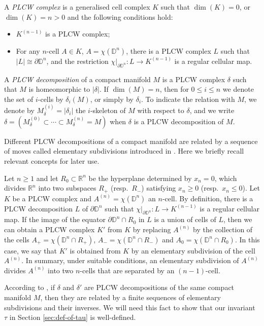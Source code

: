 \documentclass[11pt]{amsart}
\theoremstyle{definition}
\numberwithin{equation}{section}
\def\bd{{\partial}}
\def\bD{{\mathbb{D}}}
\def\bR{{\mathbb{R}}}
\def\de{\delta}
\def\to{\rightarrow}
\begin{document}
A \textit{PLCW complex} is a generalised cell complex $K$ such that $\dim(K)=0$, or $\dim(K)=n>0$ and the following conditions hold:
\begin{itemize}
\item $K^{(n-1)}$ is a PLCW complex;
\item For any $n$-cell $A \in K$, $A = \chi(\bD^n)$, there is a PLCW complex $L$ such that $|L| \cong \bd\bD^n$, and the restriction $\chi|_{\bd\bD^n}: L \to K^{(n-1)}$ is a regular cellular map.
\end{itemize}

A \emph{PLCW decomposition} of a compact manifold $M$ is a PLCW complex $\de$ such that $M$ is homeomorphic to $|\de|$. If $\dim(M)=n$, then for $0 \le i \le n$ we denote the set of $i$-cells by $\de_i(M)$, or simply by $\de_i$. To indicate the relation with $M$, we denote by $M^{(i)}_{\de} = |\de_i|$ the $i$-skeleton of $M$ with respect to $\de$, and we write $\delta = (M_\delta^{(0)} \subset \cdots \subset M_\delta^{(n)} = M)$ when $\de$ is a PLCW decomposition of $M$.

Different PLCW decompositions of a compact manifold are related by a sequence of moves called elementary subdivisions introduced in \cite[Sec.\,7]{Kir12}. Here we briefly recall relevant concepts for later use. 

Let $n \ge 1$ and let $R_0 \subset \bR^n$ be the hyperplane determined by $x_n=0$, which divides $\bR^n$ into two subspaces $R_+$ (resp.~$R_-$) satisfying $x_n \ge 0$ (resp.~$x_n\le 0$). 
Let $K$ be a PLCW complex and $A^{(n)} = \chi(\bD^n)$ an $n$-cell. 
By definition, there is a PLCW decomposition $L$ of $\bd\bD^n$ such that $\chi|_{\bd\bD^n}: L \to K^{(n-1)}$ is a regular cellular map. 
If the image of the equator $\bd \bD^n \cap R_0$ in $L$ is a union of cells of $L$, then we can obtain a PLCW complex $K'$ from $K$ by replacing $A^{(n)}$ by the collection of the cells $A_+ = \chi(\bD^n \cap R_+)$, $A_- = \chi(\bD^n \cap R_-)$ and $A_0 = \chi(\bD^n \cap R_0)$. In this case, we say that $K'$ is obtained from $K$ by an elementary subdivision of the cell $A^{(n)}$. In summary, under suitable conditions, an elementary subdivision of $A^{(n)}$ divides $A^{(n)}$ into two $n$-cells that are separated by an $(n-1)$-cell. 

According to \cite[Thm.\,8]{Kir12}, if $\de$ and $\de'$ are PLCW decompositions of the same compact manifold $M$, then they are related by a finite sequences of elementary subdivisions and their inverses. We will need this fact to show that our invariant $\tau$ in Section \ref{sec:def-of-tau} is well-defined.
\end{document}
